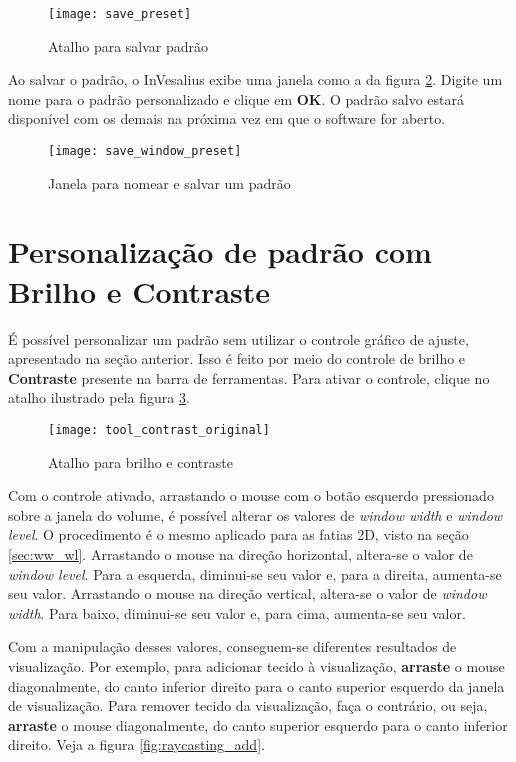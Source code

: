 \begin{figure}[!htb]
\centering
\texttt{[image: save\_preset]}
\caption{Atalho para salvar padrão}
\label{fig:save_preset}
\end{figure}
 
Ao salvar o padrão, o InVesalius exibe uma janela como a da figura \ref{fig:save_window_preset}.
Digite um nome para o padrão personalizado e clique em \textbf{OK}. O padrão salvo estará
disponível com os demais na próxima vez em que o software for aberto.

\begin{figure}[!htb]
\centering
\texttt{[image: save\_window\_preset]}
\caption{Janela para nomear e salvar um padrão}
\label{fig:save_window_preset}
\end{figure}

\section{Personalização de padrão com Brilho e Contraste}

É possível personalizar um padrão sem utilizar o controle gráfico de ajuste, apresentado na seção
anterior. Isso é feito por meio do controle de brilho e \textbf{Contraste} presente na barra de
ferramentas. Para ativar o controle, clique no atalho ilustrado pela figura
\ref{fig:tool_contrast_original_vol}.

\begin{figure}[!htb]
\centering
\texttt{[image: tool\_contrast\_original]}
\caption{Atalho para brilho e contraste}
\label{fig:tool_contrast_original_vol}
\end{figure}

Com o controle ativado, arrastando o mouse com o botão esquerdo pressionado
sobre a janela do volume, é possível alterar os valores de \textit{window width} e
\textit{window level}. O procedimento é o mesmo aplicado para as fatias 2D, visto
na seção \ref{sec:ww_wl}. Arrastando o mouse na direção horizontal, altera-se o valor de
\textit{window level}. Para a esquerda, diminui-se seu valor e, para a direita,
aumenta-se seu valor. Arrastando o mouse na direção vertical, altera-se o valor de
\textit{window width}. Para baixo, diminui-se seu valor e, para cima, aumenta-se seu
valor.

Com a manipulação desses valores, conseguem-se diferentes resultados de
visualização. Por exemplo, para adicionar tecido à visualização, \textbf{arraste} o
mouse diagonalmente, do canto inferior direito para o canto superior esquerdo da janela
de visualização. Para remover tecido da visualização, faça o contrário, ou seja,
\textbf{arraste} o mouse diagonalmente, do canto superior esquerdo para o canto inferior
direito. Veja a figura \ref{fig:raycasting_add}.

